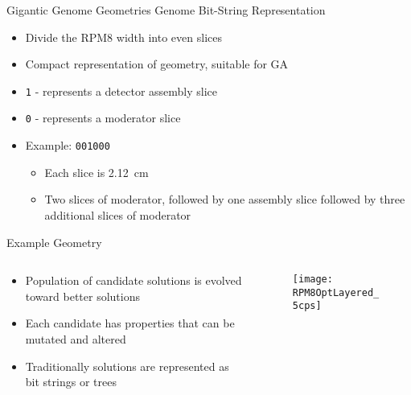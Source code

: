 \begin{frame}[fragile]{Gigantic Genome Geometries}
\label{GAMethod}
Genome Bit-String Representation
\begin{itemize}
  \item Divide the RPM8 width into even slices
  \item Compact representation of geometry, suitable for GA
  \item \verb+1+ - represents a detector assembly slice
  \item \verb+0+ - represents a moderator slice
  \item Example: \verb+001000+
  \begin{itemize}
    \item Each slice is \SI{2.12}{\centi\meter}
    \item Two slices of moderator, followed by one assembly slice followed by three additional slices of moderator
  \end{itemize}
\end{itemize}
\hyperlink{GAMethodExtended}{}
\end{frame}
\begin{frame}{Example Geometry}
\begin{columns}[onlytextwidth]
  \begin{column}{0.45\textwidth}
    \small
    \begin{itemize}
      \item Population of candidate solutions is evolved toward better solutions
      \item Each candidate has properties that can be mutated and altered
      \item Traditionally solutions are represented as bit strings or trees
    \end{itemize}
    \end{column}
  \begin{column}{0.45\textwidth}
    \begin{figure}
      \texttt{[image: RPM8OptLayered\_5cps]}
    \end{figure}
  \end{column}
\end{columns}
\hyperlink{GAMethodExtended}{}
\end{frame}
